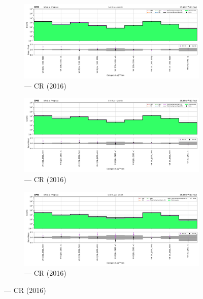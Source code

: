 \begin{figure}[htbp]
    \centering
    \begin{subfigure}[b]{0.51\textwidth}
        \includegraphics[width=\textwidth]{chapters/higgstoinv/figures/mountain_ranges/2016/VH/Wmunu_tree_fit_s-abs_values_VH_cats.pdf}
        \caption{\VH --- \singleMuCr \gls{CR} (2016)}
    \end{subfigure}

    \begin{subfigure}[b]{0.51\textwidth}
        \includegraphics[width=\textwidth]{chapters/higgstoinv/figures/mountain_ranges/2016/VH/Wenu_tree_fit_s-abs_values_VH_cats.pdf}
        \caption{\VH --- \singleEleCr \gls{CR} (2016)}
    \end{subfigure}

    \begin{subfigure}[b]{0.51\textwidth}
        \includegraphics[width=\textwidth]{chapters/higgstoinv/figures/mountain_ranges/2016/VH/Zmumu_tree_fit_s-abs_values_VH_cats.pdf}
        \caption{\VH --- \doubleMuCr \gls{CR} (2016)}
    \end{subfigure}


\end{figure}
